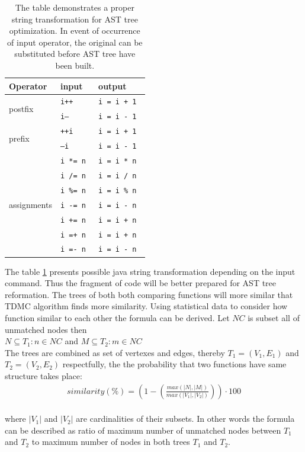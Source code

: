 \documentclass{report}
\begin{document}
\begin{table}[h]
\centering 
\begin{tabular}{|l|l|l|}
\hline
     Operator                        & input   & output     \\ \hline
\multirow{2}{*}{postfix}     & \texttt{i++}     & \texttt{i = i + 1  }  \\ \cline{2-3} 
                             & \texttt{i--}     & \texttt{i = i - 1  }  \\ \hline
\multirow{2}{*}{prefix}      & \texttt{++i}     & \texttt{i = i + 1 }   \\ \cline{2-3} 
                             & \texttt{--i }    & \texttt{i = i - 1}    \\ \hline
\multirow{7}{*}{assignments} & \texttt{i *= n } & \texttt{i = i * n } \\ \cline{2-3} 
                             & \texttt{i /= n  }& \texttt{i = i / n } \\ \cline{2-3} 
                             & \texttt{i \%= n }& \texttt{i = i \% n }\\ \cline{2-3} 
                             & \texttt{i -= n } & \texttt{i = i - n } \\ \cline{2-3} 
                             & \texttt{i += n  }& \texttt{i = i + n } \\ \cline{2-3} 
                             & \texttt{i =+ n } & \texttt{i = i + n}  \\ \cline{2-3} 
                             & \texttt{i =- n } & \texttt{i = i - n } \\ \hline
\end{tabular}
\caption{The table demonstrates a proper string transformation for AST tree optimization. In event of occurrence  of input operator, the original can be substituted before AST tree have been built.}
\label{table:operators}
\end{table}

The table \ref{table:operators} presents possible java string transformation depending on the input command. Thus the fragment of code will be better prepared for AST tree reformation. The trees of both both comparing functions will more similar that TDMC algorithm finds more similarity. Using statistical data to consider how function similar to each other the formula can be derived. Let $NC$ is subset all of unmatched nodes then\\
$ N \subseteq T_{1}: n \in NC $ and $ M \subseteq T_{2}: m \in NC $ \\
The trees are combined as set of vertexes and edges, thereby $T_{1} = (V_{1}, E_{1})$ and $T_{2} = (V_{2}, E_{2})$ respectfully, the the probability that two functions have same structure takes place: \\
\begin{gather*}
similarity(\%) =  \left ( 1 - \left (\frac{max(|N|, |M|)}{max(|V_{1}|, |V_{2}|)} \right ) \right )\cdot 100 
\end{gather*} \\
where $|V_{1}|$ and $|V_{2}|$ are cardinalities of their subsets. In other words the formula can be described as ratio of maximum number of unmatched nodes between $T_{1}$ and $T_{2}$ to maximum number of nodes in both trees $T_{1}$ and $T_{2}$. 
\end{document}
